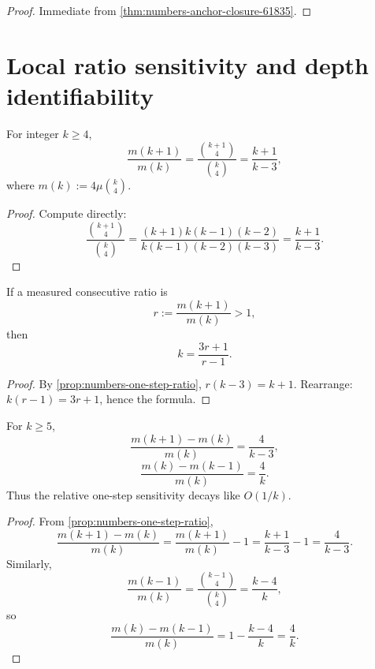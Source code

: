 \begin{proof}
Immediate from \cref{thm:numbers-anchor-closure-61835}.
\end{proof}

\section{Local ratio sensitivity and depth identifiability}
\label{sec:numbers-ratio-sensitivity}

\begin{proposition}
\label{prop:numbers-one-step-ratio}
For integer \(k\ge4\),
\[
  \frac{m(k+1)}{m(k)}
  =
  \frac{\binom{k+1}{4}}{\binom{k}{4}}
  =
  \frac{k+1}{k-3},
\]
where \(m(k):=4\mu\binom{k}{4}\).
\end{proposition}

\begin{proof}
Compute directly:
\[
  \frac{\binom{k+1}{4}}{\binom{k}{4}}
  =
  \frac{(k+1)k(k-1)(k-2)}{k(k-1)(k-2)(k-3)}
  =
  \frac{k+1}{k-3}.
\]
\end{proof}

\begin{corollary}
\label{cor:numbers-depth-from-successive-ratio}
If a measured consecutive ratio is
\[
  r:=\frac{m(k+1)}{m(k)}>1,
\]
then
\[
  k=\frac{3r+1}{r-1}.
\]
\end{corollary}

\begin{proof}
By \cref{prop:numbers-one-step-ratio},
\(
  r(k-3)=k+1
\).
Rearrange:
\(
  k(r-1)=3r+1
\), hence the formula.
\end{proof}

\begin{proposition}
\label{prop:numbers-pm1-sensitivity}
For \(k\ge5\),
\[
  \frac{m(k+1)-m(k)}{m(k)}=\frac{4}{k-3},
\]
\[
  \frac{m(k)-m(k-1)}{m(k)}=\frac{4}{k}.
\]
Thus the relative one-step sensitivity decays like \(O(1/k)\).
\end{proposition}

\begin{proof}
From \cref{prop:numbers-one-step-ratio},
\[
  \frac{m(k+1)-m(k)}{m(k)}
  =
  \frac{m(k+1)}{m(k)}-1
  =
  \frac{k+1}{k-3}-1
  =
  \frac{4}{k-3}.
\]
Similarly,
\[
  \frac{m(k-1)}{m(k)}
  =
  \frac{\binom{k-1}{4}}{\binom{k}{4}}
  =
  \frac{k-4}{k},
\]
so
\[
  \frac{m(k)-m(k-1)}{m(k)}
  =
  1-\frac{k-4}{k}
  =
  \frac{4}{k}.
\]
\end{proof}


